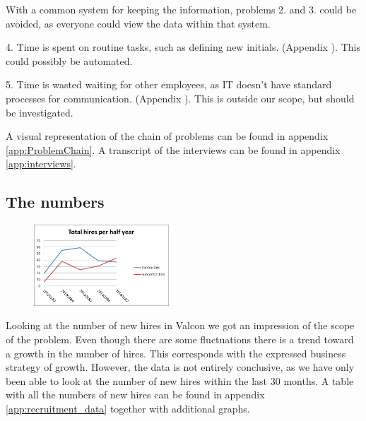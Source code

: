 With a common system for keeping the information, problems 2. and 3. could be avoided, as everyone could view the data within that system.

4. Time is spent on routine tasks, such as defining new initials.
(Appendix ).
This could possibly be automated.

5. Time is wasted waiting for other employees, as IT doesn't have standard processes for communication.
(Appendix ).
This is outside our scope, but should be investigated.

A visual representation of the chain of problems can be found in appendix \ref{app:ProblemChain}.
A transcript of the interviews can be found in appendix \ref{app:interviews}.

\subsection{The numbers}
\begin{figure}
\vspace{-20pt}
\centering
\includegraphics[width=0.45\textwidth]{appendix/total_hires_per_half_year.png}
\label{fig:total_hires_per_half_year}
\end{figure}
Looking at the number of new hires in Valcon we got an impression of the scope of the problem.
Even though there are some fluctuations there is a trend toward a growth in the number of hires.
This corresponds with the expressed business strategy of growth.
However, the data is not entirely conclusive, as we have only been able to look at the number of new hires within the last 30 months.
A table with all the numbers of new hires can be found in appendix \ref{app:recruitment_data} together with additional graphs.